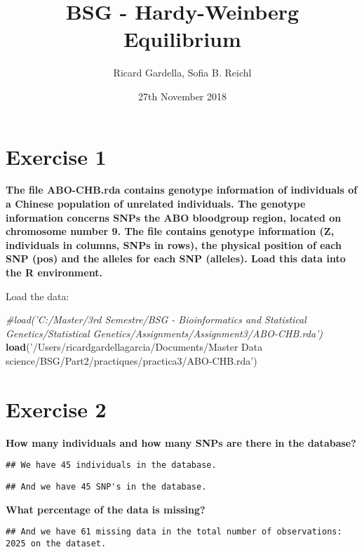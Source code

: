 \documentclass[]{article}
\title{BSG - Hardy-Weinberg Equilibrium}
\author{Ricard Gardella, Sofia B. Reichl}
\date{27th November 2018}
\newenvironment{Shaded}{\begin{snugshade}}{\end{snugshade}}
\newcommand{\KeywordTok}[1]{\textcolor[rgb]{0.13,0.29,0.53}{\textbf{#1}}}
\newcommand{\StringTok}[1]{\textcolor[rgb]{0.31,0.60,0.02}{#1}}
\newcommand{\CommentTok}[1]{\textcolor[rgb]{0.56,0.35,0.01}{\textit{#1}}}
\newcommand{\NormalTok}[1]{#1}
\begin{document}
\maketitle

\section{Exercise 1}\label{exercise-1}

\textbf{The file ABO-CHB.rda contains genotype information of
individuals of a Chinese population of unrelated individuals. The
genotype information concerns SNPs the ABO bloodgroup region, located on
chromosome number 9. The file contains genotype information (Z,
individuals in columns, SNPs in rows), the physical position of each SNP
(pos) and the alleles for each SNP (alleles). Load this data into the R
environment.}

Load the data:

\begin{Shaded}
\begin{Highlighting}[]
\CommentTok{#load('C:/Master/3rd Semestre/BSG - Bioinformatics and Statistical Genetics/Statistical Genetics/Assignments/Assignment3/ABO-CHB.rda')}
\KeywordTok{load}\NormalTok{(}\StringTok{'/Users/ricardgardellagarcia/Documents/Master Data science/BSG/Part2/practiques/practica3/ABO-CHB.rda'}\NormalTok{)}
\end{Highlighting}
\end{Shaded}

\section{Exercise 2}\label{exercise-2}

\textbf{How many individuals and how many SNPs are there in the
database?}

\begin{verbatim}
## We have 45 individuals in the database.
\end{verbatim}

\begin{verbatim}
## And we have 45 SNP's in the database.
\end{verbatim}

\textbf{What percentage of the data is missing?}

\begin{verbatim}
## And we have 61 missing data in the total number of observations: 2025 on the dataset.
\end{verbatim}
\end{document}
